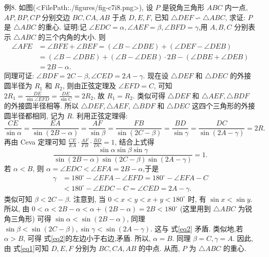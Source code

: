 例8. 如图(<FilePath:./figures/fig-c7i8.png>), 设 $P$ 是锐角三角形 $A B C$ 内一点, $A P, B P, C P$ 分别交边 $B C, C A, A B$ 于点 $D, E, F$, 已知 $\triangle D E F \backsim \triangle A B C$, 求证: $P$ 是 $\triangle A B C$ 的重心.
证明:记 $\angle E D C=\alpha, \angle A E F=\beta, \angle B F D= \gamma$,用 $A, B, C$ 分别表示 $\triangle A B C$ 的三个内角的大小.
则
$$
\begin{aligned}
\angle A F E & =\angle B F E+\angle B E F=(\angle B-\angle D B E)+(\angle D E F-\angle D E B) \\
& =(\angle B-\angle D B E)+(\angle B-\angle D E B) \cdot 2 B-(\angle D B E+\angle D E B) \\
& =2 B-\alpha .
\end{aligned}
$$
同理可证: $\angle B D F=2 C-\beta, \angle C E D=2 A-\gamma$.
现在设 $\triangle D E F$ 和 $\triangle D E C$ 的外接圆半径为 $R_1$ 和 $R_2$, 则由正弦定理及 $\angle E F D=C$, 可知 $2 R_1=\frac{D E}{\sin \angle E F D}=\frac{D E}{\sin C}=2 R_2$, 故 $R_1=R_2$. 类似可得 $\triangle D E F$ 和 $\triangle A E F, \triangle B D F$ 的外接圆半径相等.
所以 $\triangle D E F, \triangle A E F$, $\triangle B D F$ 和 $\triangle D E C$ 这四个三角形的外接圆半径都相同, 记为 $R$.
利用正弦定理得:
$$
\frac{C E}{\sin \alpha}=\frac{E A}{\sin (2 B-\alpha)}=\frac{A F}{\sin \beta}=\frac{F B}{\sin (2 C-\beta)}=\frac{B D}{\sin \gamma}=\frac{D C}{\sin (2 A-\gamma)}=2 R . \label{eq1}
$$
再由 Ceva 定理可知 $\frac{C E}{E A} \cdot \frac{A F}{F B} \cdot \frac{B D}{D C}=1$, 结合上式得
$$
\frac{\sin \alpha \sin \beta \sin \gamma}{\sin (2 B-\alpha) \sin (2 C-\beta) \sin (2 A-\gamma)}=1 . \label{eq2}
$$
若 $\alpha<B$, 则 $\alpha=\angle E D C<\angle E F A=2 B-\alpha$,于是
$$
\begin{aligned}
\gamma & =180^{\circ}-\angle E F A-\angle E F D=180^{\circ}-\angle E F A-C \\
& <180^{\circ}-\angle E D C-C=\angle C E D=2 A-\gamma .
\end{aligned}
$$
类似可知 $\beta<2 C-\beta$.
注意到, 当 $0<x<y<x+y<180^{\circ}$ 时, 有 $\sin x<\sin y$. 所以, 由 $0<\alpha< 2 B-\alpha<\alpha+(2 B-\alpha)=2 B<180^{\circ}$ (这里用到 $\triangle A B C$ 为锐角三角形) 可得 $\sin \alpha<\sin (2 B-\alpha)$, 同理 $\sin \beta<\sin (2 C-\beta), \sin \gamma<\sin (2 A-\gamma)$. 这与 式\ref{eq2} 矛盾.
类似地,若 $\alpha>B$, 可得 式\ref{eq2}的左边小于右边,矛盾.
所以, $\alpha=B$. 同理 $\beta=C, \gamma=A$. 因此, 由 式\ref{eq1}可知 $D, E, F$ 分别为 $B C, C A, A B$ 的中点.
从而, $P$ 为 $\triangle A B C$ 的重心.



